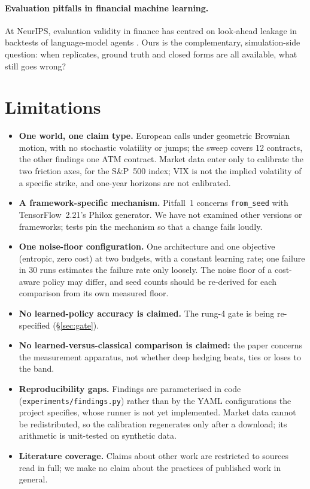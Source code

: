 \documentclass{article}
\newcommand{\fromseed}{\texttt{from\_seed}}
\begin{document}
\paragraph{Evaluation pitfalls in financial machine learning.} At NeurIPS, evaluation validity in
finance has centred on look-ahead leakage in backtests of language-model agents
\citep{li2025deepfund}. Ours is the complementary, simulation-side question: when replicates,
ground truth and closed forms are all available, what still goes wrong?

\section{Limitations}\label{sec:limits}

\begin{itemize}
\item \textbf{One world, one claim type.} European calls under geometric Brownian motion, with no
  stochastic volatility or jumps; the sweep covers 12 contracts, the other findings one ATM
  contract. Market data enter only to calibrate the two friction axes, for the S\&P~500 index;
  VIX is not the implied volatility of a specific strike, and one-year horizons are not calibrated.
\item \textbf{A framework-specific mechanism.} Pitfall~1 concerns \fromseed{} with TensorFlow~2.21's
  Philox generator. We have not examined other versions or frameworks; tests pin the mechanism so
  that a change fails loudly.
\item \textbf{One noise-floor configuration.} One architecture and one objective (entropic, zero
  cost) at two budgets, with a constant learning rate; one failure in 30 runs estimates the
  failure rate only loosely. The noise floor of a cost-aware policy may differ, and seed counts
  should be re-derived for each comparison from its own measured floor.
\item \textbf{No learned-policy accuracy is claimed.} The rung-4 gate is being re-specified
  (\S\ref{sec:gate}).
\item \textbf{No learned-versus-classical comparison is claimed:} the paper concerns the
  measurement apparatus, not whether deep hedging beats, ties or loses to the band.
\item \textbf{Reproducibility gaps.} Findings are parameterised in code
  (\texttt{experiments/findings.py}) rather than by the YAML configurations the project
  specifies, whose runner is not yet implemented. Market data cannot be redistributed, so the
  calibration regenerates only after a download; its arithmetic is unit-tested on synthetic data.
\item \textbf{Literature coverage.} Claims about other work are restricted to sources read in
  full; we make no claim about the practices of published work in general.
\end{itemize}
\end{document}
